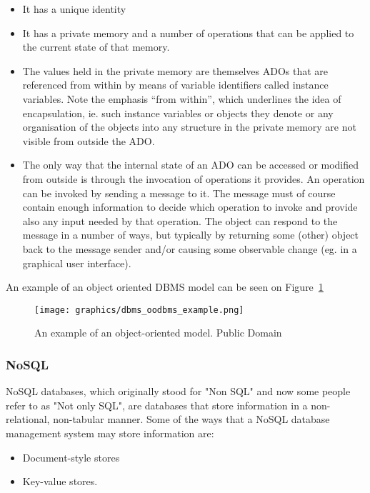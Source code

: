 \documentclass[letterpaper, 12pt]{article}
\begin{document}
\begin{itemize}
  \item It has a unique identity
  \item It has a private memory and a number of operations that can be applied to the current state of that memory.
  \item The values held in the private memory are themselves ADOs that are referenced from
within by means of variable identifiers called instance variables. Note the emphasis
“from within”, which underlines the idea of encapsulation, ie. such instance variables
or objects they denote or any organisation of the objects into any structure in the
private memory are not visible from outside the ADO.
  \item The only way that the internal state of an ADO can be accessed or modified from
outside is through the invocation of operations it provides. An operation can be
invoked by sending a message to it. The message must of course contain enough
information to decide which operation to invoke and provide also any input needed
by that operation. The object can respond to the message in a number of ways, but
typically by returning some (other) object back to the message sender and/or causing
some observable change (eg. in a graphical user interface).
\end{itemize} \cite{object_oriented_data_model}
\par\vspace{\baselineskip}
An example of an object oriented DBMS model can be seen on Figure~\ref{fig:ooDBMS_structure}
\begin{figure}
  \centering
  \label{fig:ooDBMS_structure}
  \texttt{[image: graphics/dbms\_oodbms\_example.png]}
  \caption{An example of an object-oriented model. Public Domain \cite{wikiObjectOrientedDBMS}}
\end{figure}

\subsubsection{NoSQL}
NoSQL databases, which originally stood for "Non SQL" and now some people refer to as
"Not only SQL", are databases that store information in a non-relational, non-tabular
manner. Some of the ways that a NoSQL database management system may store information are:

\begin{itemize}
  \item Document-style stores
  \item Key-value stores.
\end{itemize}
\end{document}
